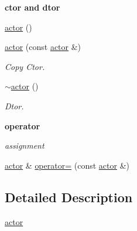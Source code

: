 \begin{Indent}{\bf ctor and dtor}\par
{\em \label{_amgrp98fbd3e5ae66fcd014fb744fec76c58d}
 }\begin{DoxyCompactItemize}
\item 
\hyperlink{classnebula_1_1content_1_1actor_1_1renderer_1_1actor_aacf637f097dea13f236dd10e90568ac2}{actor} ()
\item 
\hyperlink{classnebula_1_1content_1_1actor_1_1renderer_1_1actor_a5a58a3555552d490357a2a075c524b81}{actor} (const \hyperlink{classnebula_1_1content_1_1actor_1_1renderer_1_1actor}{actor} \&)
\begin{DoxyCompactList}\small\item\em Copy Ctor. \item\end{DoxyCompactList}\item 
\hyperlink{classnebula_1_1content_1_1actor_1_1renderer_1_1actor_ac4b87aa931f3d49ce6bb96f27e541591}{$\sim$actor} ()
\begin{DoxyCompactList}\small\item\em Dtor. \item\end{DoxyCompactList}\end{DoxyCompactItemize}
\end{Indent}
\begin{Indent}{\bf operator}\par
{\em \label{_amgrp4b583376b2767b923c3e1da60d10de59}
 assignment }\begin{DoxyCompactItemize}
\item 
\hyperlink{classnebula_1_1content_1_1actor_1_1renderer_1_1actor}{actor} \& \hyperlink{classnebula_1_1content_1_1actor_1_1renderer_1_1actor_ac6d5635a4fcdbf531ff46b4c9f9623c7}{operator=} (const \hyperlink{classnebula_1_1content_1_1actor_1_1renderer_1_1actor}{actor} \&)
\end{DoxyCompactItemize}
\end{Indent}


\subsection{Detailed Description}
\hyperlink{classnebula_1_1content_1_1actor_1_1renderer_1_1actor}{actor} 

